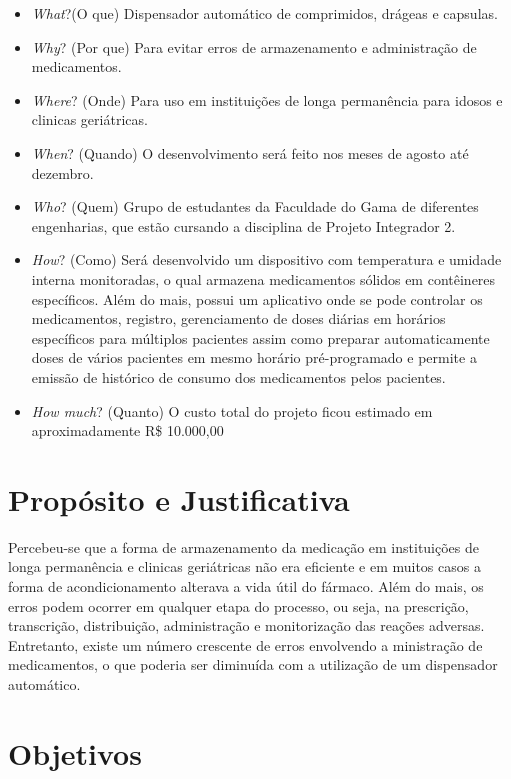 \begin{apendicesenv}
\begin{itemize}
\item \textit{What}?(O que) Dispensador automático de comprimidos, drágeas e capsulas.
\item \textit{Why}? (Por que) Para evitar erros de armazenamento e administração de medicamentos.
\item \textit{Where}? (Onde) Para uso em instituições de longa permanência para idosos e clinicas geriátricas.
\item \textit{When}? (Quando) O desenvolvimento será feito nos meses de agosto até dezembro.
\item \textit{Who}? (Quem) Grupo de estudantes da Faculdade do Gama de diferentes engenharias, que estão cursando a disciplina de Projeto Integrador 2.
\item \textit{How}? (Como) Será desenvolvido um dispositivo com temperatura e umidade interna monitoradas, o qual armazena medicamentos sólidos em contêineres específicos. Além do mais, possui um aplicativo onde se pode controlar os medicamentos, registro, gerenciamento de doses diárias em horários específicos para múltiplos pacientes assim como preparar automaticamente doses de vários pacientes em mesmo horário pré-programado e permite a emissão de histórico de consumo dos medicamentos pelos pacientes.


\item \textit{How much}? (Quanto) O custo total do projeto ficou estimado em aproximadamente R\$ 10.000,00
\end{itemize}

\section{Propósito e Justificativa}

Percebeu-se que a forma de armazenamento da medicação em instituições de longa permanência e clinicas geriátricas não era eficiente e em muitos casos a forma de acondicionamento alterava a vida útil do fármaco. Além do mais, os erros podem ocorrer em qualquer etapa do processo, ou seja, na prescrição, transcrição, distribuição, administração e monitorização das reações adversas. Entretanto, existe um número crescente de erros envolvendo a ministração de medicamentos, o que poderia ser diminuída com a utilização de um dispensador automático.

\section{Objetivos}


\end{apendicesenv}
